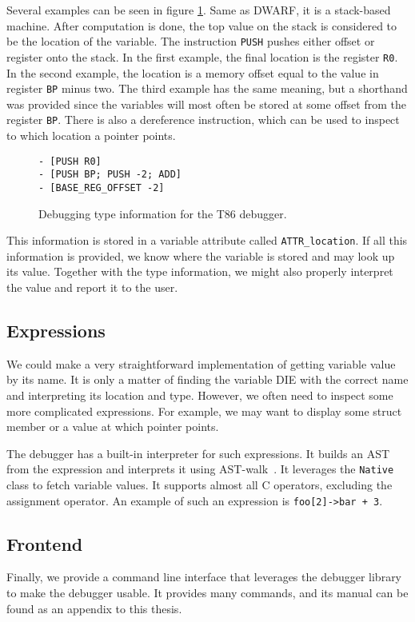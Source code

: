 Several examples can be seen in figure \ref{fig:t86dbg-vm}. Same as DWARF, it
is a stack-based machine. After computation is done, the top value on the stack
is considered to be the location of the variable. The instruction \texttt{PUSH}
pushes either offset or register onto the stack. In the first example, the
final location is the register \texttt{R0}. In the second example, the location
is a memory offset equal to the value in register \texttt{BP} minus two. The
third example has the same meaning, but a shorthand was provided since the
variables will most often be stored at some offset from the register
\texttt{BP}. There is also a dereference instruction, which can be used to
inspect to which location a pointer points.

\begin{figure}
    \begin{lstlisting}
- [PUSH R0]
- [PUSH BP; PUSH -2; ADD]
- [BASE_REG_OFFSET -2]
    \end{lstlisting}
    \caption{Debugging type information for the T86 debugger.}
    \label{fig:t86dbg-vm}
\end{figure}

This information is stored in a variable attribute called
\texttt{ATTR\_location}. If all this information is provided, we know where the
variable is stored and may look up its value. Together with the type
information, we might also properly interpret the value and report it to the
user.

\subsection{Expressions}
We could make a very straightforward implementation of getting variable value
by its name. It is only a matter of finding the variable DIE with the correct
name and interpreting its location and type. However, we often need to inspect
some more complicated expressions. For example, we may want to display some
struct member or a value at which pointer points.

The debugger has a built-in interpreter for such expressions. It builds an AST
from the expression and interprets it using
AST-walk~\cite{crafting-interpreters}. It leverages the \texttt{Native} class
to fetch variable values. It supports almost all C operators, excluding the
assignment operator. An example of such an expression is \texttt{foo[2]->bar + 3}.

\subsection{Frontend}
Finally, we provide a command line interface that leverages the debugger
library to make the debugger usable. It provides many commands, and its manual
can be found as an appendix to this thesis.

